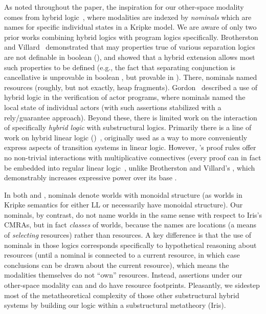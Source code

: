 As noted throughout the paper, the inspiration for our other-space modality comes from hybrid logic~\cite{areces2001hybrid,blackburn1995hybrid,gargov1993modal,goranko1996hierarchies},
where modalities are indexed by \emph{nominals} which are names for specific individual states in a Kripke model.
We are aware of only two prior works combining hybrid logics with program logics specifically. 
Brotherston and Villard~\cite{brotherston2014parametric} demonstrated that may properties true of various 
separation logics are not definable in boolean \BI (\BBI), and showed that a hybrid extension \HyBBI allows
most such properties to be defined (e.g., the fact that separating conjunction is cancellative is unprovable 
in boolean \BI, but provable in \HyBBI). There, nominals named resources 
(roughly, but not exactly, heap fragments). 
Gordon~\cite{gordon2019modal} described a use of hybrid logic in the verification of actor programs, 
where nominals named the local state of individual actors (with such assertions stabilized with a 
rely/guarantee approach). Beyond these, there is limited work on the interaction of specifically 
\emph{hybrid logic} with substructural logics. 
Primarily there is a line of work on hybrid linear logic (\HyLL)~\cite{despeyroux2014hybrid}, 
originally used as a way to more conveniently express aspects of transition systems in linear logic. 
However, \HyLL's proof rules offer no non-trivial interactions with multiplicative connectives 
(every \HyLL proof can in fact be embedded into regular linear logic~\cite{chaudhuri2019hybrid}, 
unlike Brotherston and Villard's \HyBBI, which demonstrably increases expressive power over its base \BBI.

In both \HyLL and \HyBBI, nominals denote worlds with monoidal structure (as worlds in Kripke semantics
for either LL or \BBI necessarily have monoidal structure). Our nominals, by contrast, 
do not name worlds in the same sense with respect to Iris's CMRAs, 
but in fact \emph{classes} of worlds, because the names are locations 
(a means of \emph{selecting} resources) rather than resources.  
A key difference is that the use of nominals in those logics corresponds specifically to hypothetical 
reasoning about resources (until a nominal is connected to a current resource, in which case conclusions 
can be drawn about the current resource), which means the modalities themselves do not ``own'' resources. 
Instead, assertions under our other-space modality can and do
have resource footprints.
Pleasantly, we sidestep most of the metatheoretical complexity of those other substructural hybrid
systems by building our logic within a substructural metatheory (Iris).